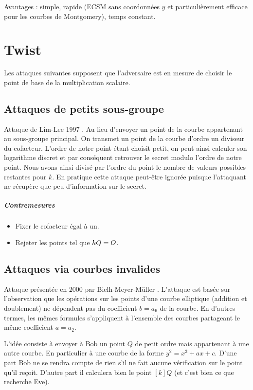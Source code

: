 \documentclass[a4paper]{report}
\begin{document}
Avantages : simple, rapide (ECSM sans coordonnées $y$ et particulièrement efficace pour les courbes de Montgomery), temps constant.

\section{Twist}
Les attaques suivantes supposent que l'adversaire est en mesure de choisir le point de base de la multiplication scalaire.

\subsection{Attaques de petits sous-groupe}
Attaque de Lim-Lee 1997 \cite{lim1997}. Au lieu d'envoyer un point de la courbe appartenant au sous-groupe principal. On transmet un point de la courbe d'ordre un diviseur du cofacteur. L'ordre de notre point étant choisit petit, on peut ainsi calculer son logarithme discret et par conséquent retrouver le secret modulo l'ordre de notre point. Nous avons ainsi divisé par l'ordre du point le nombre de valeurs possibles restantes pour $k$. 
En pratique cette attaque peut-être ignorée puisque l'attaquant ne récupère que peu d'information sur le secret.

\subparagraph{Contremesures}
\begin{itemize}[label=$\rightarrow$]
    \item Fixer le cofacteur égal à un.
    \item Rejeter les points tel que $hQ = O{}$.
\end{itemize}



\subsection{Attaques via courbes invalides}
Attaque présentée en 2000 par Bielh-Meyer-Müller \cite{biehl2000}. L'attaque est basée sur l'observation que les opérations sur les points d'une courbe elliptique (addition et doublement) ne dépendent pas du coefficient $b = a_6$ de la courbe. En d'autres termes, les mêmes formules s'appliquent à l'ensemble des courbes partageant le même coefficient $a = a_2$. 

L'idée consiste à envoyer à Bob un point $Q$ de petit ordre mais appartenant à une autre courbe. En particulier à une courbe de la forme $y^2 = x^3 + ax + c$. D'une part Bob ne se rendra compte de rien s'il ne fait aucune vérification sur le point qu'il reçoit. D'autre part il calculera bien le point $[k]Q$ (et c'est bien ce que recherche Eve).
\end{document}
